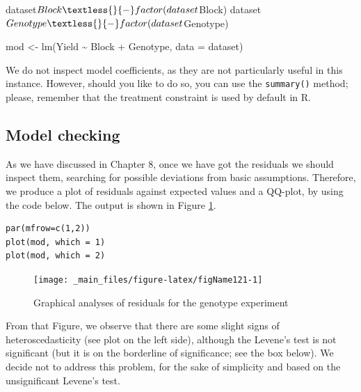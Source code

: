 \documentclass[a4paper,12pt,oneside]{book}
\newenvironment{Shaded}{\begin{snugshade}}{\end{snugshade}}
\newcommand{\SpecialCharTok}[1]{#1}
\newcommand{\OtherTok}[1]{#1}
\newcommand{\FunctionTok}[1]{#1}
\newcommand{\AttributeTok}[1]{#1}
\newcommand{\NormalTok}[1]{#1}
\begin{document}
\begin{Shaded}
\begin{Highlighting}[]
\NormalTok{dataset}\SpecialCharTok{$}\NormalTok{Block }\OtherTok{\textless{}{-}} \FunctionTok{factor}\NormalTok{(dataset}\SpecialCharTok{$}\NormalTok{Block)}
\NormalTok{dataset}\SpecialCharTok{$}\NormalTok{Genotype }\OtherTok{\textless{}{-}} \FunctionTok{factor}\NormalTok{(dataset}\SpecialCharTok{$}\NormalTok{Genotype)}

\NormalTok{mod }\OtherTok{\textless{}{-}} \FunctionTok{lm}\NormalTok{(Yield }\SpecialCharTok{\textasciitilde{}}\NormalTok{ Block }\SpecialCharTok{+}\NormalTok{ Genotype, }\AttributeTok{data =}\NormalTok{ dataset)}
\end{Highlighting}
\end{Shaded}

We do not inspect model coefficients, as they are not particularly useful in this instance. However, should you like to do so, you can use the \texttt{summary()} method; please, remember that the treatment constraint is used by default in R.

\hypertarget{model-checking}{%
\subsection{Model checking}\label{model-checking}}

As we have discussed in Chapter 8, once we have got the residuals we should inspect them, searching for possible deviations from basic assumptions. Therefore, we produce a plot of residuals against expected values and a QQ-plot, by using the code below. The output is shown in Figure \ref{fig:figName121}.

\vspace{12pt}

\begin{verbatim}
par(mfrow=c(1,2))
plot(mod, which = 1)
plot(mod, which = 2)
\end{verbatim}

\vspace{12pt}
\begin{figure}

{\centering \texttt{[image: \_main\_files/figure-latex/figName121-1]} 

}

\caption{Graphical analyses of residuals for the genotype experiment}\label{fig:figName121}
\end{figure}

From that Figure, we observe that there are some slight signs of heteroscedasticity (see plot on the left side), although the Levene's test is not significant (but it is on the borderline of significance; see the box below). We decide not to address this problem, for the sake of simplicity and based on the unsignificant Levene's test.
\end{document}
